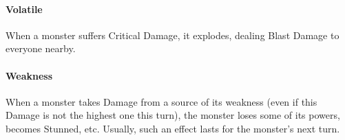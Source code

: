 \documentclass[itdr/core]{subfiles}
\begin{document}
\vfill
\paragraph{Volatile}
When a monster suffers Critical Damage, it explodes, dealing Blast Damage to everyone nearby.

\vfill
\paragraph{Weakness}
When a monster takes Damage from a source of its weakness (even if this Damage is not the highest one this turn), the monster loses some of its powers, becomes Stunned, etc. Usually, such an effect lasts for the monster's next turn.\tight

\vfill
\end{document}
